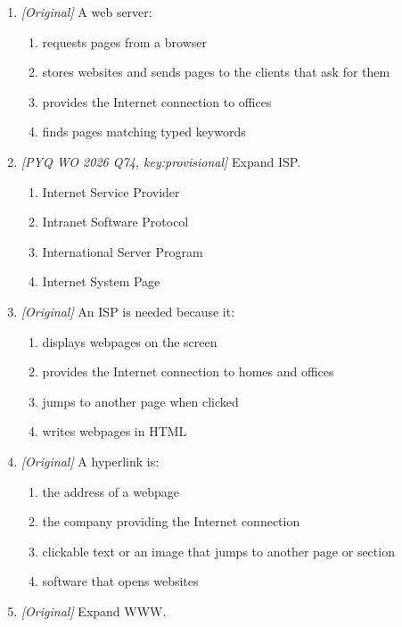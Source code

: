 \documentclass[11pt]{article}
\begin{document}
\begin{enumerate}[label=\textbf{Q\arabic*.}, leftmargin=*]
\begin{enumerate}[label=\Alph*.]
    \item requests a service or resource, such as a webpage
    \item stores websites for many users
  \end{enumerate}
\item \textit{[Original]} A web server:
  \begin{enumerate}[label=\Alph*.]
    \item requests pages from a browser
    \item stores websites and sends pages to the clients that ask for them
    \item provides the Internet connection to offices
    \item finds pages matching typed keywords
  \end{enumerate}
\item \textit{[PYQ WO 2026 Q74, key:provisional]} Expand ISP.
  \begin{enumerate}[label=\Alph*.]
    \item Internet Service Provider
    \item Intranet Software Protocol
    \item International Server Program
    \item Internet System Page
  \end{enumerate}
\item \textit{[Original]} An ISP is needed because it:
  \begin{enumerate}[label=\Alph*.]
    \item displays webpages on the screen
    \item provides the Internet connection to homes and offices
    \item jumps to another page when clicked
    \item writes webpages in HTML
  \end{enumerate}
\item \textit{[Original]} A hyperlink is:
  \begin{enumerate}[label=\Alph*.]
    \item the address of a webpage
    \item the company providing the Internet connection
    \item clickable text or an image that jumps to another page or section
    \item software that opens websites
  \end{enumerate}
\item \textit{[Original]} Expand WWW.
  \begin{enumerate}[label=\Alph*.]

\end{enumerate}
\end{enumerate}
\end{document}
